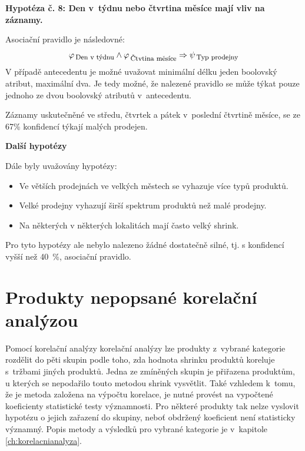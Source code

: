 \vspace*{1em}

\textbf{Hypotéza č. 8: Den v~týdnu nebo čtvrtina měsíce mají vliv na záznamy.}

Asociační pravidlo je následovné:
\begin{equation}
    \varphi_{\mbox{\,\footnotesize Den v~týdnu}} \land  \varphi_{\mbox{\,\footnotesize Čtvtina měsíce}} \Rightarrow \psi_{\mbox{\,\footnotesize Typ prodejny}}
\end{equation} 
V případě antecedentu je možné uvažovat minimální délku jeden boolovský atribut, maximální dva. Je tedy možné, že nalezené pravidlo se může týkat pouze jednoho ze dvou boolovský atributů v~antecedentu.

Záznamy uskutečněné ve středu, čtvrtek a pátek v~poslední čtvrtině měsíce, se ze 67\% konfidencí týkají malých prodejen.

\textbf{Další hypotézy}

Dále byly uvažovány hypotézy:
\begin{itemize}
    \itemsep 0em
    \item Ve větších prodejnách ve velkých městech se vyhazuje více typů produktů.
    \item Velké prodejny vyhazují širší spektrum produktů než malé prodejny.
    \item Na některých v některých lokalitách mají často velký shrink.
\end{itemize}

Pro tyto hypotézy ale nebylo nalezeno žádné dostatečně silné, tj. s konfidencí vyšší než 40~\%, asociační pravidlo.

\section{Produkty nepopsané korelační analýzou}

Pomocí korelační analýzy korelační analýzy lze produkty z~vybrané kategorie rozdělit do pěti skupin podle toho, zda hodnota shrinku produktů koreluje s~tržbami jiných produktů. Jedna ze zmíněných skupin je přiřazena produktům, u kterých se nepodařilo touto metodou shrink vysvětlit. Také vzhledem k~tomu, že je metoda založena na výpočtu korelace, je nutné provést na vypočtené koeficienty statistické testy významnosti. Pro některé produkty tak nelze vyslovit hypotézu o jejich zařazení do skupiny, neboť obdržený koeficient není statisticky významný. Popis metody a výsledků pro vybrané kategorie je v~kapitole \ref*{ch:korelacnianalyza}.

